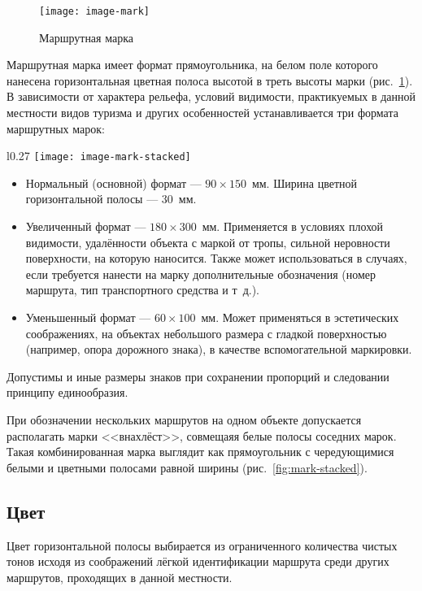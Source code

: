\documentclass[a5paper,10pt,titlepage]{extarticle}
\begin{document}
\begin{figure}
	\centering
	\texttt{[image: image-mark]}
	\caption{Маршрутная марка}\label{fig:mark}
\end{figure}

Маршрутная марка имеет формат прямоугольника, на белом поле которого нанесена горизонтальная цветная полоса высотой в
треть высоты марки (рис.~\ref{fig:mark}). В зависимости от характера рельефа, условий видимости, практикуемых в данной
местности видов туризма и других особенностей устанавливается три формата маршрутных марок:
\begin{wrapfigure}{l}{0.27\textwidth}
	\centering
	\texttt{[image: image-mark-stacked]}
	\caption{Комбинированная маршрутная марка}\label{fig:mark-stacked}
\end{wrapfigure}

\begin{itemize}
	\item Нормальный (основной) формат --- $90\times150$~мм. Ширина цветной горизонтальной полосы --- 30~мм.
	\item Увеличенный формат --- $180\times300$~мм. Применяется в условиях плохой видимости, удалённости объекта с маркой от
тропы, сильной неровности поверхности, на которую наносится. Также может использоваться в случаях, если требуется
нанести на марку дополнительные обозначения (номер маршрута, тип транспортного средства и т~д.).
\item Уменьшенный формат --- $60\times100$~мм. Может применяться в эстетических соображениях, на объектах небольшого размера с
гладкой поверхностью (например, опора дорожного знака), в качестве вспомогательной маркировки.
\end{itemize}

Допустимы и иные размеры знаков при сохранении пропорций и следовании принципу единообразия.

При обозначении нескольких маршрутов на одном объекте допускается располагать марки <<внахлёст>>, совмещаяя белые полосы
соседних марок. Такая комбинированная марка выглядит как прямоугольник с чередующимися белыми и цветными полосами равной
ширины (рис.~\ref{fig:mark-stacked}).

\subsection{Цвет}
Цвет горизонтальной полосы выбирается из ограниченного количества чистых тонов исходя из соображений лёгкой
идентификации маршрута среди других маршрутов, проходящих в данной местности.
\end{document}
